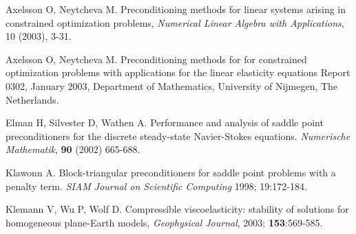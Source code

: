 \documentclass{report}
\begin{document}
\begin{thebibliography}{ABC}
Axelsson O, Neytcheva M.
Preconditioning methods for linear systems arising in constrained
optimization problems,
{\em Numerical Linear Algebra with Applications}, 10 (2003), 3-31.

Axelsson O, Neytcheva M.
Preconditioning methods for for constrained optimization problems
with applications for the linear elasticity equations
Report 0302, January 2003, Department of Mathematics,
University of Nijmegen, The Netherlands.

Elman H, Silvester D, Wathen A. Performance and analysis of saddle
point preconditioners for the discrete steady-state Navier-Stokes equations.
\textit{Numerische Mathematik}, {\bf 90} (2002) 665-688.

 Klawonn A. Block-triangular preconditioners for saddle
point problems with a penalty term. {\em SIAM Journal on Scientific
Computing} 1998;
19:172-184.

Klemann V, Wu P, Wolf D. Compressible viscoelasticity: stability of
solutions for homogeneous plane-Earth models,
\textit{Geophysical Journal}, 2003; \textbf{153}:569-585.

\end{thebibliography}
\end{document}
